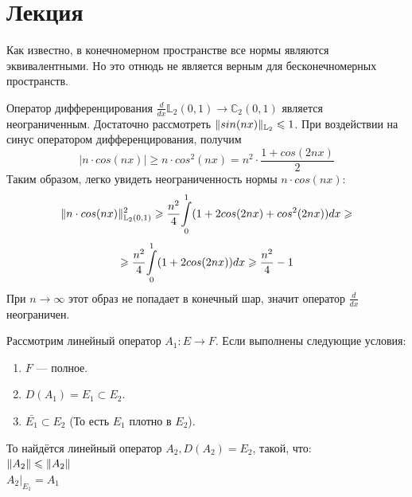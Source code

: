 	\section{Лекция}

	Как известно, в конечномерном пространстве все нормы являются эквивалентными. Но это отнюдь не является верным для бесконечномерных
	пространств.
	
	\example Оператор дифференцирования $\frac{d}{dx} \mathbb{L}_2(0, 1) \rightarrow \mathbb{C}_2(0, 1)$ является неограниченным. 
	Достаточно рассмотреть $\| sin(nx) \|_{\mathbb{L}_2} \leqslant 1$. При воздействии на синус оператором дифференцирования, получим
	$$|n \cdot cos(nx)| \geq n \cdot cos^2(nx) = n^2 \cdot \frac{1 + cos(2nx)}{2}$$
	Таким образом, легко увидеть неограниченность нормы $n \cdot cos(nx)$:
	$$\| n \cdot cos(nx) \|_{\mathbb{L}_2(0,1)}^2 \geqslant \frac{n^2}{4} \underset{0}{\overset{1}{\int}} (1 + 2 cos(2nx) + cos^2(2nx)) dx \geqslant$$
	$$\geqslant \frac{n^2}{4} \underset{0}{\overset{1}{\int}} (1 + 2 cos(2nx)) dx \geqslant \frac{n^2}{4} - 1$$
	При $n \rightarrow \infty$ этот образ не попадает в конечный шар, значит оператор $\frac{d}{dx}$ неограничен.
	
	
	\begin{theorem}
		Рассмотрим линейный оператор $A_1 : E \rightarrow F$. Если выполнены следующие условия:
		\begin{enumerate}
			\item $F$ --- полное.
			\item $D(A_1) = E_1 \subset E_2$.
			\item $\bar{E_1} \subset E_2$ (То есть $E_1$ плотно в $E_2$).
		\end{enumerate}
		То найдётся линейный оператор $A_2, D(A_2) = E_2$, такой, что: \\
		$\| A_2 \| \leqslant \| A_2 \|$ \\
		$A_2 |_{E_1} = A_1$
	\end{theorem}
	
